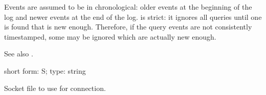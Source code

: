 \documentclass[letterpaper,10pt,english]{sphinxmanual}
\begin{document}
\begin{fulllineitems}
\sphinxAtStartPar
Events are assumed to be in chronological: older events at the beginning of
the log and newer events at the end of the log.  {\hyperref[\detokenize{mariadb-query-digest:cmdoption-mariadb-query-digest-since}]{}} is strict: it
ignores all queries until one is found that is new enough.  Therefore, if
the query events are not consistently timestamped, some may be ignored which
are actually new enough.

\sphinxAtStartPar
See also {\hyperref[\detokenize{mariadb-query-digest:cmdoption-mariadb-query-digest-until}]{}}.

\end{fulllineitems}


\begin{fulllineitems}
\label{\detokenize{mariadb-query-digest:cmdoption-mariadb-query-digest-socket}}
\sphinxAtStartPar
short form: \sphinxhyphen{}S; type: string

\sphinxAtStartPar
Socket file to use for connection.

\end{fulllineitems}

\end{document}
